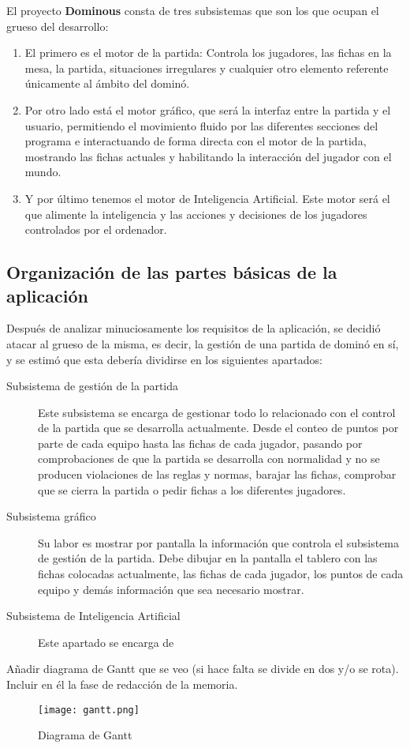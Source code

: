 El proyecto \textbf{Dominous} consta de tres subsistemas que son los que ocupan el grueso del desarrollo:
\begin{enumerate}
    \item El primero es el motor de la partida: Controla los jugadores, las fichas en la mesa, la partida, situaciones irregulares
            y cualquier otro elemento referente únicamente al ámbito del dominó.
    \item Por otro lado está el motor gráfico, que será la interfaz entre la partida y el usuario, permitiendo el movimiento
            fluido por las diferentes secciones del programa e interactuando de forma directa con el motor de la partida,
            mostrando las fichas actuales y habilitando la interacción del jugador con el mundo.
    \item Y por último tenemos el motor de Inteligencia Artificial. Este motor será el que alimente la inteligencia
            y las acciones y decisiones de los jugadores controlados por el ordenador.
\end{enumerate}

\subsection{Organización de las partes básicas de la aplicación}

Después de analizar minuciosamente los requisitos de la aplicación, se decidió atacar al grueso de la misma,
es decir, la gestión de una partida de dominó en sí, y se estimó que esta debería dividirse en los siguientes
apartados:
\begin{description}
    \item[Subsistema de gestión de la partida] Este subsistema se encarga de gestionar todo lo relacionado
            con el control de la partida que se desarrolla actualmente. Desde el conteo de puntos por parte
            de cada equipo hasta las fichas de cada jugador, pasando por comprobaciones de que la partida
            se desarrolla con normalidad y no se producen violaciones de las reglas y normas, barajar las
            fichas, comprobar que se cierra la partida o pedir fichas a los diferentes jugadores.
    \item[Subsistema gráfico] Su labor es mostrar por pantalla la información que controla el subsistema
            de gestión de la partida. Debe dibujar en la pantalla el tablero con las fichas colocadas
            actualmente, las fichas de cada jugador, los puntos de cada equipo y demás información que
            sea necesario mostrar.
    \item[Subsistema de Inteligencia Artificial] Este apartado se encarga de 
\end{description}

Añadir diagrama de Gantt que se veo (si hace falta se divide en dos y/o se rota). Incluir en él la fase de redacción de la memoria.

\begin{figure}[h]
  \label{logo-sdl}
  \begin{center}
    \texttt{[image: gantt.png]}
  \end{center}
  \caption{Diagrama de Gantt}
\end{figure}

